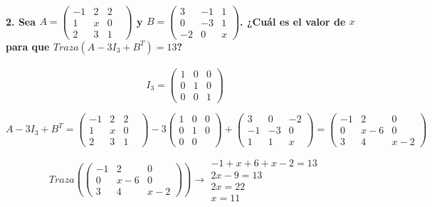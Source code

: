 \documentclass[
]{article}
\begin{document}
\hypertarget{sea-a-beginpmatrix--1-2-21-x-0231endpmatrix-y-b-beginpmatrix3-110-31-20x-endpmatrix.-cuuxe1l-es-el-valor-de-x-para-que-trazaa-3i_3bt-13}{%
\paragraph{\texorpdfstring{2. Sea
\(A = \begin{pmatrix} -1 & 2& 2&\\1 & x & 0\\2&3&1\end{pmatrix}\) y
\(B = \begin{pmatrix}3&-1&1\\0&-3&1\\-2&0&x \end{pmatrix}\). ¿Cuál es el
valor de \(x\) para que
\(Traza(A-3I_3+B^T) = 13\)?}{2. Sea A = \textbackslash begin\{pmatrix\} -1 \& 2\& 2\&\textbackslash\textbackslash1 \& x \& 0\textbackslash\textbackslash2\&3\&1\textbackslash end\{pmatrix\} y B = \textbackslash begin\{pmatrix\}3\&-1\&1\textbackslash\textbackslash0\&-3\&1\textbackslash\textbackslash-2\&0\&x \textbackslash end\{pmatrix\}. ¿Cuál es el valor de x para que Traza(A-3I\_3+B\^{}T) = 13?}}\label{sea-a-beginpmatrix--1-2-21-x-0231endpmatrix-y-b-beginpmatrix3-110-31-20x-endpmatrix.-cuuxe1l-es-el-valor-de-x-para-que-trazaa-3i_3bt-13}}

\[
I_3 =  \begin{pmatrix}1&0&0\\0&1&0\\0&0&1\end{pmatrix}
\]

\[
A-3I_3+B^T =  \begin{pmatrix} -1 & 2& 2&\\1 & x & 0\\2&3&1\end{pmatrix} -  3\begin{pmatrix}1&0&0\\0&1&0\\0&0&\end{pmatrix} +  \begin{pmatrix}3&0&-2\\-1&-3&0\\1&1&x\end{pmatrix} =  \begin{pmatrix}-1&2&0\\0&x-6&0\\3&4&x-2\end{pmatrix}
\]

\[
Traza(\begin{pmatrix}-1&2&0\\0&x-6&0\\3&4&x-2\end{pmatrix}) \rightarrow \begin{align*}
    -1+x+6+x-2 = 13\\
    2x-9=13\\
    2x=22\\
    x = 11
\end{align*}
\]
\end{document}
